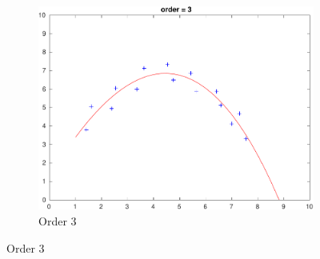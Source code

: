 \begin{figure}[htbp]
	\centering
	\begin{subfigure}[t]{0.5\textwidth}
		\centering
		\includegraphics[width=\textwidth]{hw1/problem1/f1.pdf}
		\caption{Order 3}\label{fig:1a}
	\end{subfigure}


\end{figure}
